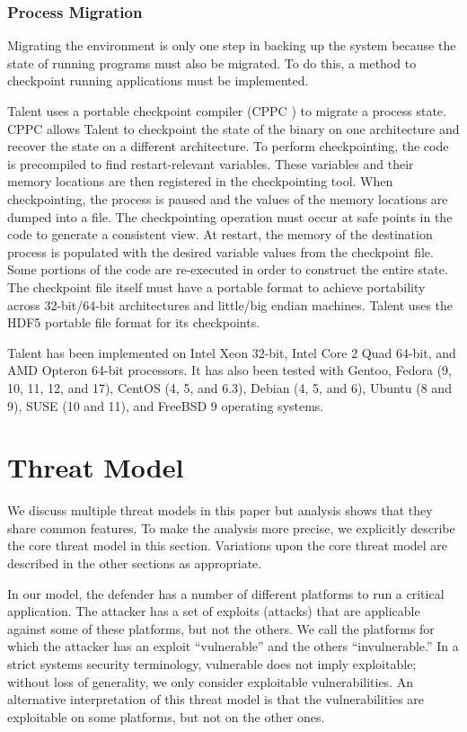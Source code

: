 \documentclass{acm_proc_article-sp}
\begin{document}
\subsubsection{Process Migration}

Migrating the environment is only one step in backing up the system because the state of running programs must also be migrated. To do this, a method to checkpoint running applications must be implemented. 

Talent uses a portable checkpoint compiler (CPPC \cite{cppc}) to migrate a process state. CPPC allows Talent to checkpoint the state of the binary on one architecture and recover the state on a different architecture. To perform checkpointing, the code is precompiled to find restart-relevant variables. These variables and their memory locations are then registered in the
checkpointing tool. When checkpointing, the process is paused and the values of the memory locations are dumped into a file. The checkpointing operation must occur at safe points in the code to generate a consistent view. At restart, the memory of the destination process is populated with the desired variable values from the checkpoint file. Some portions of the code are re-executed in order to construct the entire state. The checkpoint file itself must have a portable format to achieve portability across 32-bit/64-bit architectures and little/big endian machines. Talent uses the HDF5 portable file format \cite{HDF5} for its checkpoints.

Talent has been implemented on Intel Xeon 32-bit, Intel Core 2 Quad 64-bit, and AMD Opteron 64-bit processors. It has also been tested with Gentoo, Fedora (9, 10, 11, 12, and 17), CentOS (4, 5, and 6.3), Debian (4, 5, and 6), Ubuntu (8 and 9), SUSE (10 and 11), and FreeBSD 9 operating systems.

\section{Threat Model}
\label{TM}

We discuss multiple threat models in this paper but analysis shows that they share common features. To make the analysis
more precise, we explicitly describe the core threat model in this section. Variations upon the core threat model are
described in the other sections as appropriate.

In our model, the defender has a number of different platforms to run a critical application. The attacker has a set of exploits (attacks) that are applicable against some of these platforms, but not the others. We call the platforms for which the attacker has an exploit ``vulnerable'' and the others ``invulnerable.'' In a strict systems security terminology, vulnerable does not imply exploitable; without loss of generality, we only consider exploitable vulnerabilities. An alternative interpretation of this threat model is that the vulnerabilities are exploitable on some platforms, but not on the other ones.
\end{document}
